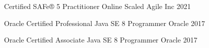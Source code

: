 

\begin{cvhonors}

  \cvhonor
    {Certified SAFe® 5 Practitioner} %
    {Online} %
    {Scaled Agile Inc} %
    {2021} %

  \cvhonor
    {Oracle Certified Professional} %
    {Java SE 8 Programmer} %
    {Oracle} %
    {2017} %

  \cvhonor
    {Oracle Certified Associate} %
    {Java SE 8 Programmer} %
    {Oracle} %
    {2017} %

\end{cvhonors}
